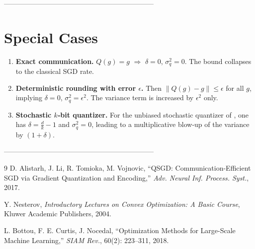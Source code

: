 \documentclass{article}
\begin{document}
-----------------------------------------------------------------
\section*{Special Cases}
\begin{enumerate}[label={S\arabic*}.]
\item \textbf{Exact communication.} $Q(g)=g$ $\Rightarrow$ $\delta=0$, $\sigma_{q}^{2}=0$. The bound collapses to the classical SGD rate.
\item \textbf{Deterministic rounding with error $\epsilon$.} Then $\|Q(g)-g\|\le\epsilon$ for all $g$, implying $\delta=0$, $\sigma_{q}^{2}=\epsilon^{2}$. The variance term is increased by $\epsilon^{2}$ only.
\item \textbf{Stochastic $k$‑bit quantizer.} For the unbiased stochastic quantizer of \cite{Alistarh2017}, one has $\delta=\frac{d}{k}-1$ and $\sigma_{q}^{2}=0$, leading to a multiplicative blow‑up of the variance by $(1+\delta)$.
\end{enumerate}

-----------------------------------------------------------------
\begin{thebibliography}{9}
D. Alistarh, J. Li, R. Tomioka, M. Vojnovic, ``QSGD: Communication-Efficient SGD via Gradient Quantization and Encoding,'' \emph{Adv. Neural Inf. Process. Syst.}, 2017.

Y. Nesterov, \emph{Introductory Lectures on Convex Optimization: A Basic Course}, Kluwer Academic Publishers, 2004.

L. Bottou, F. E. Curtis, J. Nocedal, ``Optimization Methods for Large-Scale Machine Learning,'' \emph{SIAM Rev.}, 60(2): 223–311, 2018.
\end{thebibliography}
\end{document}
